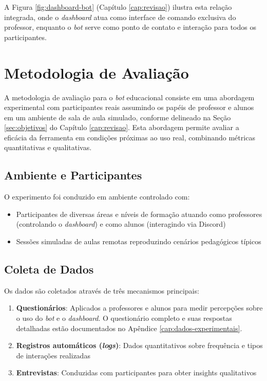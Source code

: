 A Figura \ref{fig:dashboard-bot} (Capítulo \ref{cap:revisao}) ilustra esta
relação integrada, onde o \textit{dashboard} atua como interface de comando
exclusiva do professor, enquanto o \textit{bot} serve como ponto de contato e
interação para todos os participantes.

\section{Metodologia de Avaliação}
\label{sec:metodologia}

A metodologia de avaliação para o \textit{bot} educacional consiste em uma
abordagem experimental com participantes reais assumindo os papéis de professor
e alunos em um ambiente de sala de aula simulado, conforme delineado na Seção
\ref{sec:objetivos} do Capítulo \ref{cap:revisao}. Esta abordagem permite
avaliar a eficácia da ferramenta em condições próximas ao uso real, combinando
métricas quantitativas e qualitativas.

\subsection{Ambiente e Participantes}
\label{subsec:ambiente}

O experimento foi conduzido em ambiente controlado com:

\begin{itemize}
\item Participantes de diversas áreas e níveis de formação atuando como
professores (controlando o \textit{dashboard}) e como alunos (interagindo via
Discord)
\item Sessões simuladas de aulas remotas reproduzindo cenários pedagógicos
típicos
\end{itemize}

\subsection{Coleta de Dados}
\label{subsec:coleta}

Os dados são coletados através de três mecanismos principais:

\begin{enumerate}
\item \textbf{Questionários}: Aplicados a professores e alunos para medir
percepções sobre o uso do \textit{bot} e o \textit{dashboard}. O questionário
completo e suas respostas detalhadas estão documentados no Apêndice
\ref{cap:dados-experimentais}.
\item \textbf{Registros automáticos (\textit{logs})}: Dados quantitativos sobre
frequência e tipos de interações realizadas
\item \textbf{Entrevistas}: Conduzidas com participantes para obter insights
qualitativos
\end{enumerate}

